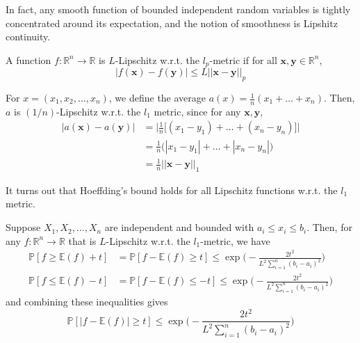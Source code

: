 \documentclass{article}
\begin{document}
      In fact, any smooth function of bounded independent random variables is tightly concentrated around its expectation, and the notion of smoothness is Lipshitz continuity. 

      \begin{definition}
        A function $f: \mathbb{R}^n \longrightarrow \mathbb{R}$ is $L$-Lipschitz w.r.t. the $l_p$-metric if for all $\mathbf{x}, \mathbf{y} \in \mathbb{R}^n$, 
        \begin{equation}
          |f(\mathbf{x}) - f(\mathbf{y})| \leq L ||\mathbf{x} - \mathbf{y}||_p
        \end{equation}
      \end{definition}

      \begin{example}
        For $x = (x_1, x_2, \ldots, x_n)$, we define the average $a(x) = \frac{1}{n} (x_1 + \ldots + x_n)$. Then, $a$ is $(1/n)$-Lipschitz w.r.t. the $l_1$ metric, since for any $\mathbf{x}, \mathbf{y}$, 
        \begin{align*}
          |a(\mathbf{x}) - a(\mathbf{y})| & = \bigg| \frac{1}{n} \big[ (x_1 - y_1) + \ldots + (x_n - y_n) \big] \bigg| \\
          & = \frac{1}{n} \big( |x_1 - y_1| + \ldots + |x_n - y_n| \big) \\
          & = \frac{1}{n} ||\mathbf{x} - \mathbf{y} ||_1
        \end{align*}
      \end{example}

      It turns out that Hoeffding's bound holds for all Lipschitz functions w.r.t. the $l_1$ metric. 

      \begin{theorem}
        Suppose $X_1, X_2, \ldots, X_n$ are independent and bounded with $a_i \leq x_i \leq b_i$. Then, for any $f: \mathbb{R}^n \longrightarrow \mathbb{R}$ that is $L$-Lipschitz w.r.t. the $l_1$-metric, we have 
        \begin{align*}
          \mathbb{P} [ f \geq \mathbb{E}(f) + t] & = \mathbb{P} [ f - \mathbb{E}(f) \geq t] \leq \exp\bigg(- \frac{2 t^2}{L^2 \sum_{i=1}^n (b_i - a_i)^2} \bigg) \\
          \mathbb{P} [ f \leq \mathbb{E}(f) - t] & = \mathbb{P} [ f - \mathbb{E}(f) \leq -t] \leq \exp\bigg(- \frac{2 t^2}{L^2 \sum_{i=1}^n (b_i - a_i)^2} \bigg)
        \end{align*}
        and combining these inequalities gives 
        \begin{equation}
          \mathbb{P} [ |f - \mathbb{E}(f)| \geq t] \leq \exp\bigg(- \frac{2 t^2}{L^2 \sum_{i=1}^n (b_i - a_i)^2} \bigg)
        \end{equation}
      \end{theorem}
\end{document}
